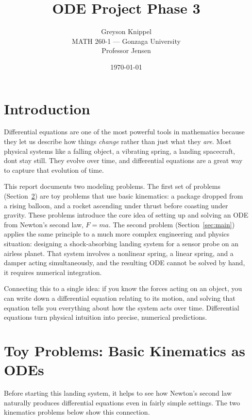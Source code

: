 \documentclass[12pt]{article}
\title{ODE Project Phase 3}
\author{
Greyson Knippel \\[4pt]
MATH 260-1 --- Gonzaga University \\[4pt]
Professor Jensen
}
\date{\today}
\begin{document}
\maketitle

\section{Introduction}

Differential equations are one of the most powerful tools in mathematics because they
let us describe how things \textit{change} rather than just what they \textit{are}. Most physical
systems like a falling object, a vibrating spring, a landing spacecraft, dont stay still. They
evolve over time, and differential equations are a great way to capture that evolution of time.

This report documents two modeling problems. The first set of problems (Section~\ref{sec:toy})
are toy problems that use basic kinematics: a package dropped from a rising balloon, and a
rocket ascending under thrust before coasting under gravity. These problems introduce the core
idea of setting up and solving an ODE from Newton's second law, $F = ma$. The second problem
(Section~\ref{sec:main}) applies the same principle to a much more complex engineering and physics situation:
designing a shock-absorbing landing system for a sensor probe on an airless planet. That system
involves a nonlinear spring, a linear spring, and a damper acting simultaneously, and the resulting
ODE cannot be solved by hand, it requires numerical integration.

Connecting this to a single idea: if you know the forces acting on an object, you
can write down a differential equation relating to its motion, and solving that equation tells you
everything about how the system acts over time. Differential equations turn physical intuition
into precise, numerical predictions.

\section{Toy Problems: Basic Kinematics as ODEs}
\label{sec:toy}

Before starting this landing system, it helps to see how Newton's second law naturally produces
differential equations even in fairly simple settings. The two kinematics problems below show this
connection.
\end{document}
